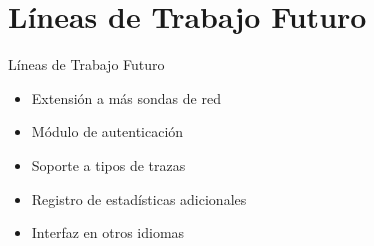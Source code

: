 \section{Líneas de Trabajo Futuro}

\begin{frame}{Líneas de Trabajo Futuro}
  \begin{itemize}[<alert@+>]
    \item Extensión a más sondas de red
    \item Módulo de autenticación
    \item Soporte a tipos de trazas
    \item Registro de estadísticas adicionales
    \item Interfaz en otros idiomas
  \end{itemize}
\end{frame}
